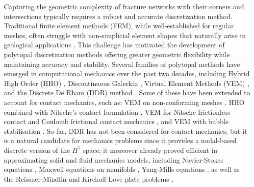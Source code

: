 \documentclass[a4paper,11pt]{article}
\theoremstyle{definition}
\theoremstyle{remark}
\begin{document}
Capturing the geometric complexity of fracture networks with their corners and intersections typically requires a robust and accurate discretization method. Traditional finite element methods (FEM), while well-established for regular meshes, often struggle with non-simplicial element shapes that naturally arise in geological applications \cite{brennerscott, hho-book}. This challenge has motivated the development of polytopal discretization methods offering greater geometric flexibility while maintaining accuracy and stability. Several families of polytopal methods have emerged in computational mechanics over the past two decades, including Hybrid High Order (HHO) \cite{dipietro-ern,hho-book}, Discontinuous Galerkin \cite{hansbo-larson}, Virtual Element Methods (VEM) \cite{beirao-brezzi-marini}, and the Discrete De Rham (DDR) method \cite{DDR19,pjddr}. Some of these have been extended to account for contact mechanics, such as: VEM on non-conforming meshes \cite{Wriggers-2022}, HHO combined with Nitsche's contact formulation \cite{CEP20}, VEM for Nitsche frictionless contact \cite{rolandlaazirifrictionless} and Coulomb frictional contact mechanics \cite{LM25}, and VEM with bubble stabilisation \cite{jhr}. So far, DDR has not been considered for contact mechanics, but it is a natural candidate for mechanics problems since it provides a nodal-based discrete version of the $H^1$ space; it moreover already proved efficient in approximating solid and fluid mechanics models, including Navier-Stokes equations \cite{Di-Pietro.Droniou.ea:24}, Maxwell equations on manifolds \cite{DRONIOU2025113886}, Yang-Mills equations \cite{droniou-yang-mills}, as well as the Reissner-Mindlin and Kirchoff-Love plate problems \cite{pietro-reissner,ddr_kl}.
\end{document}
